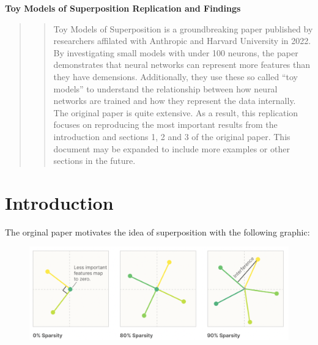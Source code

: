 \documentclass{article} %
\begin{document}


\noindent\makebox[\linewidth]{\rule{\textwidth}{1pt}} 
\vspace*{0mm} %
\begin{center}
    \Large\textbf{Toy Models of Superposition Replication and Findings}
\end{center}
\vspace*{2mm} %
\noindent\makebox[\linewidth]{\rule{\textwidth}{1pt}}
\vspace*{0mm}

\begin{abstract}
\begin{quote}
    Toy Models of Superposition\cite{elhage2022toy} is a groundbreaking paper published by 
    researchers affilated with Anthropic and Harvard University in 2022. By 
    investigating small models with under 100 neurons, the paper demonstrates 
    that neural networks can represent more features than they have demensions. 
    Additionally, they use these so called ``toy models'' to understand the 
    relationship between how neural networks are trained and how they represent 
    the data internally. The original paper is quite extensive. As a result, this
    replication focuses on reproducing the most important results from the  
    introduction and sections 1, 2 and 3 of the original paper. This document 
    may be expanded to include more examples or other sections in the future.
\end{quote}
\end{abstract}
\section{Introduction}
The orginal paper motivates the idea of superposition with the following graphic:

\begin{figure}[h]
    \centering
    \includegraphics[width=0.61\linewidth]{section_1/images/section1_anthropic_graphic_.png}
    \captionsetup{font=footnotesize} %
    \label{fig:section1_anthropic}
\end{figure}
\end{document}
